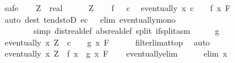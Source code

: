 \begin{isabellebody}
\isamarkupfalse%
\ safe\isanewline
\ \ \isamarkupfalse%
\ Z\ {\isacharcolon}{\kern0pt}{\isacharcolon}{\kern0pt}\ real\isanewline
\ \ \isamarkupfalse%
\ {\isachardoublequoteopen}{}\ {\isacharless}{\kern0pt}\ Z{\isachardoublequoteclose}\isanewline
\ \ \isamarkupfalse%
\ f\ {\isacartoucheopen}{}\ {\isacharless}{\kern0pt}\ c{\isacartoucheclose}\ \isamarkupfalse%
\ {\isachardoublequoteopen}eventually\ {\isacharparenleft}{\kern0pt}{\isasymlambda}x{\isachardot}{\kern0pt}\ c\ {\isacharslash}{\kern0pt}\ {}\ {\isacharless}{\kern0pt}\ f\ x{\isacharparenright}{\kern0pt}\ F{\isachardoublequoteclose}\isanewline
\ \ \ \ \isamarkupfalse%
\ {\isacharparenleft}{\kern0pt}auto\ dest{\isacharbang}{\kern0pt}{\isacharcolon}{\kern0pt}\ tendstoD{\isacharbrackleft}{\kern0pt}\ e{\isacharequal}{\kern0pt}{\isachardoublequoteopen}c\ {\isacharslash}{\kern0pt}\ {}{\isachardoublequoteclose}{\isacharbrackright}{\kern0pt}\ elim{\isacharbang}{\kern0pt}{\isacharcolon}{\kern0pt}\ eventually{\isacharunderscore}{\kern0pt}mono\isanewline
\ \ \ \ \ \ \ \ simp{\isacharcolon}{\kern0pt}\ dist{\isacharunderscore}{\kern0pt}real{\isacharunderscore}{\kern0pt}def\ abs{\isacharunderscore}{\kern0pt}real{\isacharunderscore}{\kern0pt}def\ split{\isacharcolon}{\kern0pt}\ if{\isacharunderscore}{\kern0pt}split{\isacharunderscore}{\kern0pt}asm{\isacharparenright}{\kern0pt}\isanewline
\ \ \isamarkupfalse%
\ \isamarkupfalse%
\ g\ \isamarkupfalse%
\ {\isachardoublequoteopen}eventually\ {\isacharparenleft}{\kern0pt}{\isasymlambda}x{\isachardot}{\kern0pt}\ {\isacharparenleft}{\kern0pt}Z\ {\isacharslash}{\kern0pt}\ c\ {\isacharasterisk}{\kern0pt}\ {}{\isacharparenright}{\kern0pt}\ {\isasymle}\ g\ x{\isacharparenright}{\kern0pt}\ F{\isachardoublequoteclose}\isanewline
\ \ \ \ \isamarkupfalse%
\ filterlim{\isacharunderscore}{\kern0pt}at{\isacharunderscore}{\kern0pt}top\ \isamarkupfalse%
\ auto\isanewline
\ \ \isamarkupfalse%
\ \isamarkupfalse%
\ {\isachardoublequoteopen}eventually\ {\isacharparenleft}{\kern0pt}{\isasymlambda}x{\isachardot}{\kern0pt}\ Z\ {\isasymle}\ f\ x\ {\isacharasterisk}{\kern0pt}\ g\ x{\isacharparenright}{\kern0pt}\ F{\isachardoublequoteclose}\isanewline
\ \ \isamarkupfalse%
\ eventually{\isacharunderscore}{\kern0pt}elim\isanewline
\ \ \ \ \isamarkupfalse%
\ {\isacharparenleft}{\kern0pt}elim\ x{\isacharparenright}{\kern0pt}\isanewline

\end{isabellebody}
